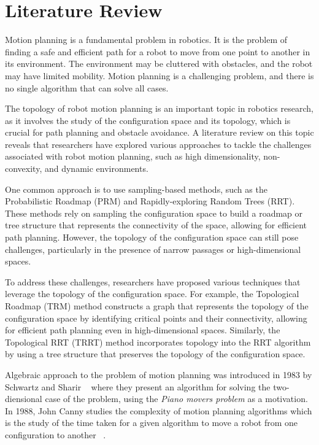 \section{Literature Review}
Motion planning is a fundamental problem in robotics. It is the problem of finding a safe and efficient path for a robot to move from one point to another in its environment. The environment may be cluttered with obstacles, and the robot may have limited mobility. Motion planning is a challenging problem, and there is no single algorithm that can solve all cases.

The topology of robot motion planning is an important topic in robotics research, as it involves the study of the configuration space and its topology, which is crucial for path planning and obstacle avoidance. A literature review on this topic reveals that researchers have explored various approaches to tackle the challenges associated with robot motion planning, such as high dimensionality, non-convexity, and dynamic environments.

One common approach is to use sampling-based methods, such as the Probabilistic Roadmap (PRM) and Rapidly-exploring Random Trees (RRT). These methods rely on sampling the configuration space to build a roadmap or tree structure that represents the connectivity of the space, allowing for efficient path planning. However, the topology of the configuration space can still pose challenges, particularly in the presence of narrow passages or high-dimensional spaces.

To address these challenges, researchers have proposed various techniques that leverage the topology of the configuration space. For example, the Topological Roadmap (TRM) method constructs a graph that represents the topology of the configuration space by identifying critical points and their connectivity, allowing for efficient path planning even in high-dimensional spaces. Similarly, the Topological RRT (TRRT) method incorporates topology into the RRT algorithm by using a tree structure that preserves the topology of the configuration space.

Algebraic approach to the problem of motion planning was introduced in 1983 by Schwartz and Sharir ~\cite{schwartz:1983a} where they present an algorithm for solving the two-diensional case of the problem, using the \textit{Piano movers problem} as a motivation. In 1988, John Canny studies the complexity of motion planning algorithms which is the study of the time taken for a given algorithm to move a robot from one configuration to another ~\cite{canny1988}. 

